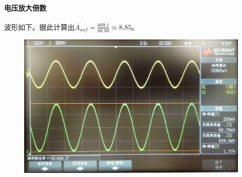 \documentclass[12pt,a4paper]{article}
\begin{document}
\begin{spacing}{1.3}
\paragraph{电压放大倍数} 波形如下。据此计算出$\dot{A_{usf}} = \frac{609.1}{68.80} \approx 8.85$。
\begin{figure}[H]
\centering
\includegraphics[width=\textwidth]{pic1.jpg}
\end{figure}

\end{spacing}
\end{document}
